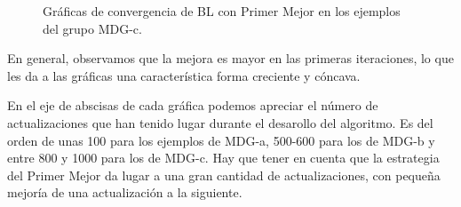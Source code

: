 \documentclass{article}
\begin{document}
\begin{figure}[H]
	\caption{Gráficas de convergencia de BL con Primer Mejor en los ejemplos del grupo MDG-c.}
	\label{fig:graph-bl-firstbest-c}
\end{figure}

En general, observamos que la mejora es mayor en las primeras iteraciones, lo que les da a las gráficas una característica forma
creciente y cóncava.

En el eje de abscisas de cada gráfica podemos apreciar el número de actualizaciones que han tenido lugar durante el desarollo del
 algoritmo.
Es del orden de unas 100 para los ejemplos de MDG-a, 500-600 para los de MDG-b y entre 800 y 1000 para los de MDG-c. Hay que 
tener en cuenta que la estrategia del Primer Mejor da lugar a una gran cantidad de actualizaciones, con pequeña mejoría de
una actualización a la siguiente.
\end{document}
